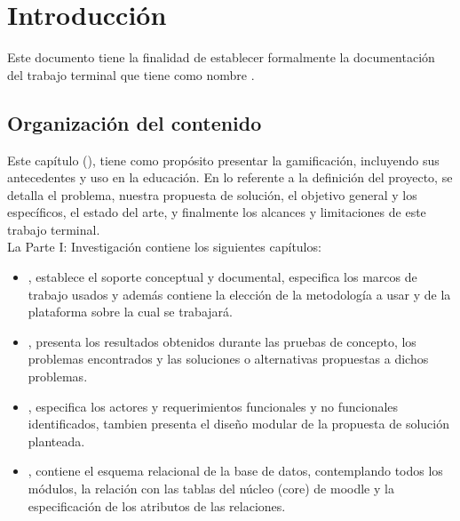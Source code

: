 \chapter{Introducción}
\label{ch:introduccion}

Este documento tiene la finalidad de establecer formalmente la documentación del trabajo terminal {\numeroTT} que tiene como nombre {\bf\tituloTT}.

\section{Organización del contenido}

Este capítulo (), tiene como propósito presentar la gamificación, incluyendo sus antecedentes y uso en la educación. En lo referente a la definición del proyecto, se detalla el problema, nuestra propuesta de solución, el objetivo general y los específicos, el estado del arte, y finalmente los alcances y limitaciones de este trabajo terminal.\\

\noindent La {\pf Parte I: Investigación} contiene los siguientes capítulos:%

    \begin{itemize}
        \item {}, establece el soporte conceptual y documental, 
        especifica los marcos de trabajo usados y además contiene la elección de la 
        metodología a usar y de la plataforma sobre la cual se trabajará.
        
        \item {}, presenta los resultados obtenidos durante 
        las pruebas de concepto, los problemas encontrados y las soluciones o alternativas 
        propuestas a dichos problemas.
    
        \item {}, especifica los actores y requerimientos funcionales
        y no funcionales identificados, tambien presenta el diseño modular de la propuesta
        de solución planteada.
        
        \item {}, contiene el esquema relacional de la base de 
        datos, contemplando todos los módulos, la relación con las tablas del núcleo (core)
        de moodle y la especificación de los atributos de las relaciones.
    \end{itemize}

